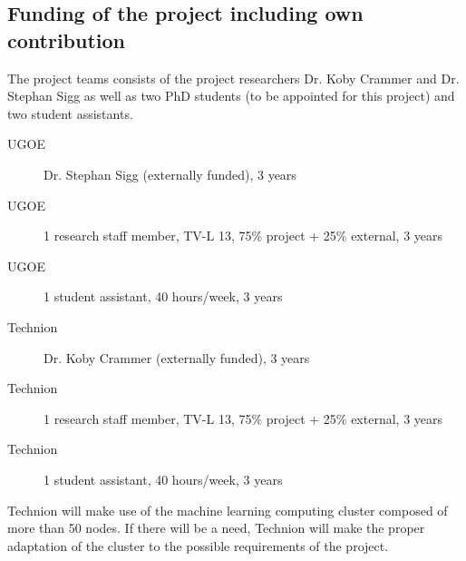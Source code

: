 \documentclass[12pt]{article}
\begin{document}
\subsection*{Funding of the project including own contribution}
The project teams consists of the project researchers Dr. Koby Crammer and Dr. Stephan Sigg as well as two PhD students (to be appointed for this project) and two student assistants.
\begin{description}
	\item[UGOE] Dr. Stephan Sigg (externally funded), 3 years
	\item[UGOE] 1 research staff member, TV-L 13, 75\% project + 25\% external, 3 years
	\item[UGOE] 1 student assistant, 40 hours/week, 3 years
	\item[Technion] Dr. Koby Crammer (externally funded), 3 years 
	\item[Technion] 1 research staff member, TV-L 13, 75\% project + 25\% external, 3 years 
	\item[Technion] 1 student assistant, 40 hours/week, 3 years 
\end{description}
Technion will make use of the machine learning computing cluster composed of more than 50 nodes. If there will be a need, Technion will make the proper adaptation of the cluster to the possible requirements of the project.


\pagebreak
\end{document}
